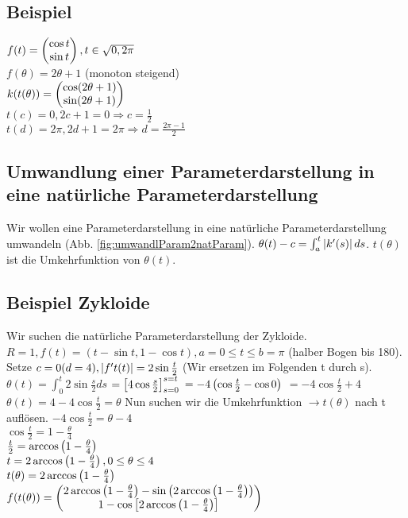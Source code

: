 \subsection{Beispiel}
$f(t) =  \begin{pmatrix} \cos t\\ \sin t \end{pmatrix} , t\in \sqrt{0,2\pi}$\\
$f(\theta) = 2\theta + 1$ (monoton steigend)\\
$k(t(\theta)) =  \begin{pmatrix} \cos(2\theta +1)\\ \sin(2\theta+1) \end{pmatrix} $\\
$t(c) = 0, 2c+1=0 \Rightarrow c=\frac{1}{2}$\\
$t(d) = 2\pi, 2d+1=2\pi \Rightarrow d=\frac{2\pi -1}{2}$

\subsection{Umwandlung einer Parameterdarstellung in eine natürliche Parameterdarstellung}
Wir wollen eine Parameterdarstellung in eine natürliche Parameterdarstellung umwandeln (Abb. \ref{fig:umwandlParam2natParam}). 
$ \theta(t) - c = \int_{a}^{t}  \left\vert k'(s) \right\vert  ds $. 
$ t(\theta) $ ist die Umkehrfunktion von $ \theta(t) $. 

\subsection{Beispiel Zykloide}
Wir suchen die natürliche Parameterdarstellung der Zykloide. 
$ R=1, f(t)=(t-\sin t, 1- \cos t), a=0 \leq t \leq b=\pi$ (halber Bogen bis 180\grad). Setze $c=0 (d=4),  \left\vert f't(t) \right\vert =2 \sin \frac{t}{2}$ (Wir ersetzen im Folgenden t durch s).\\
$\theta(t)=\int_{0}^{t} 2 \sin \frac{s}{2} ds$
$=  \left[ 4 \cos \frac{s}{2} \right] _{s=0}^{s=t}$
$=-4  \left( \cos \frac{t}{2} - \cos 0 \right) $
$= -4 \cos \frac{t}{2} + 4$\\
$\theta(t) = 4-4\cos \frac{t}{2} = \theta $ Nun suchen wir die Umkehrfunktion $\to t(\theta)$ nach t auflösen. 
$-4 \cos \frac{t}{2} = \theta - 4$\\
$\cos \frac{t}{2} = 1 - \frac{\theta}{4}$\\
$\frac{t}{2} = \arccos \left( 1-\frac{\theta}{4} \right) $\\
$t = 2 \arccos \left( 1-\frac{\theta}{4} \right) , 0\leq \theta \leq 4$ \\
$t(\theta) = 2 \arccos  \left( 1-\frac{\theta}{4} \right) $\\
$f(t(\theta)) =  \begin{pmatrix} 2 \arccos  \left( 1-\frac{\theta}{4} \right)  - \sin  \left( 2 \arccos  \left( 1-\frac{\theta}{4} \right)  \right)  \\ 1-\cos  \left[ 2 \arccos  \left( 1-\frac{\theta}{4} \right)  \right]  \end{pmatrix} $

